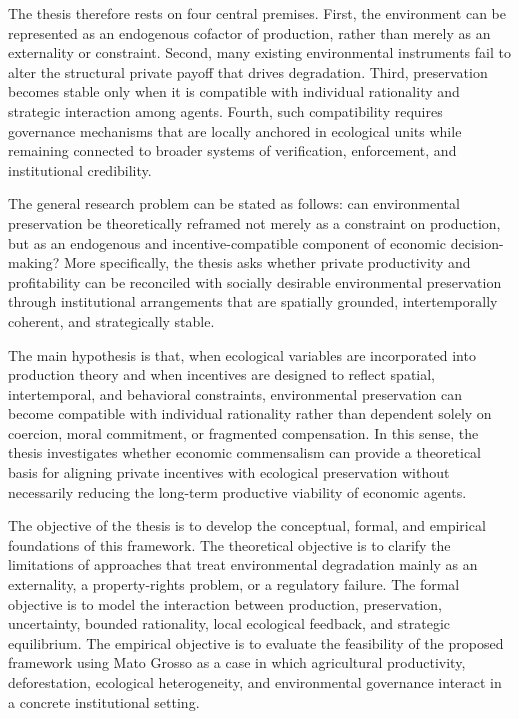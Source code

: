 The thesis therefore rests on four central premises. First, the environment can be represented as an endogenous cofactor of production, rather than merely as an externality or constraint. Second, many existing environmental instruments fail to alter the structural private payoff that drives degradation. Third, preservation becomes stable only when it is compatible with individual rationality and strategic interaction among agents. Fourth, such compatibility requires governance mechanisms that are locally anchored in ecological units while remaining connected to broader systems of verification, enforcement, and institutional credibility.

The general research problem can be stated as follows: can environmental preservation be theoretically reframed not merely as a constraint on production, but as an endogenous and incentive-compatible component of economic decision-making? More specifically, the thesis asks whether private productivity and profitability can be reconciled with socially desirable environmental preservation through institutional arrangements that are spatially grounded, intertemporally coherent, and strategically stable.

The main hypothesis is that, when ecological variables are incorporated into production theory and when incentives are designed to reflect spatial, intertemporal, and behavioral constraints, environmental preservation can become compatible with individual rationality rather than dependent solely on coercion, moral commitment, or fragmented compensation. In this sense, the thesis investigates whether economic commensalism can provide a theoretical basis for aligning private incentives with ecological preservation without necessarily reducing the long-term productive viability of economic agents.

The objective of the thesis is to develop the conceptual, formal, and empirical foundations of this framework. The theoretical objective is to clarify the limitations of approaches that treat environmental degradation mainly as an externality, a property-rights problem, or a regulatory failure. The formal objective is to model the interaction between production, preservation, uncertainty, bounded rationality, local ecological feedback, and strategic equilibrium. The empirical objective is to evaluate the feasibility of the proposed framework using Mato Grosso as a case in which agricultural productivity, deforestation, ecological heterogeneity, and environmental governance interact in a concrete institutional setting.

